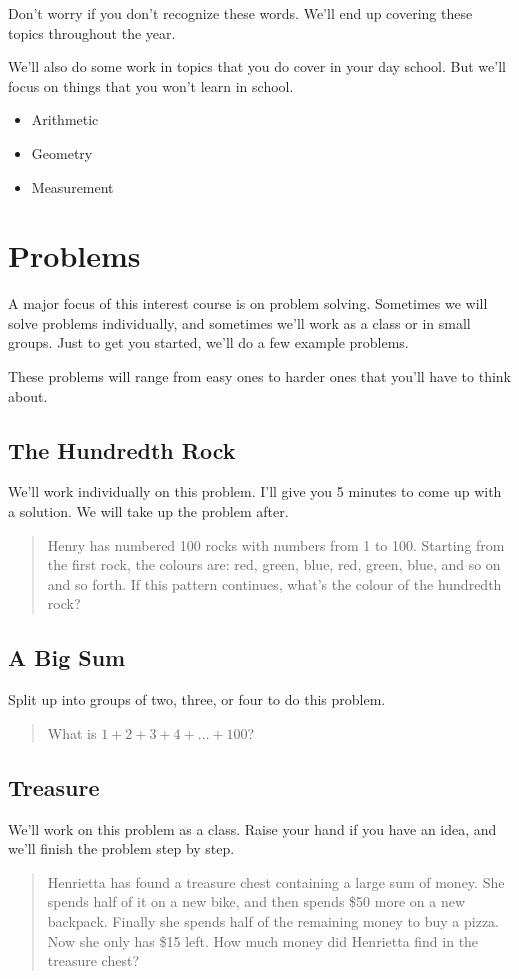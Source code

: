 \documentclass[letterpaper,10pt]{article}
\begin{document}
Don't worry if you don't recognize these words. We'll end up covering these
topics throughout the year.

We'll also do some work in topics that you do cover in your day school. But
we'll focus on things that you won't learn in school.

\begin{itemize}
 \item Arithmetic
 \item Geometry
 \item Measurement
\end{itemize}

\section{Problems}
A major focus of this interest course is on problem solving. Sometimes we
will solve problems individually, and sometimes we'll work as a class or
in small groups. Just to get you started, we'll do a few example problems.

These problems will range from easy ones to harder ones that you'll have
to think about.

\subsection{The Hundredth Rock}
We'll work individually on this problem. I'll give you 5 minutes to come
up with a solution. We will take up the problem after.

\begin{quotation}
 Henry has numbered 100 rocks with numbers from 1 to 100. Starting from
 the first rock, the colours are: red, green, blue, red, green, blue, 
 and so on and so forth. If this pattern continues, what's the colour of
 the hundredth rock?
\end{quotation}

\subsection{A Big Sum}
Split up into groups of two, three, or four to do this problem.

\begin{quotation}
 What is $1+2+3+4+\ldots+100$?
\end{quotation}

\subsection{Treasure}
We'll work on this problem as a class. Raise your hand if you have an
idea, and we'll finish the problem step by step.

\begin{quotation}
 Henrietta has found a treasure chest containing a large sum of money. She
 spends half of it on a new bike, and then spends \$50 more on a new
 backpack. Finally she spends half of the remaining money to buy a pizza.
 Now she only has \$15 left. How much money did Henrietta find in the
 treasure chest?
\end{quotation}
\end{document}
